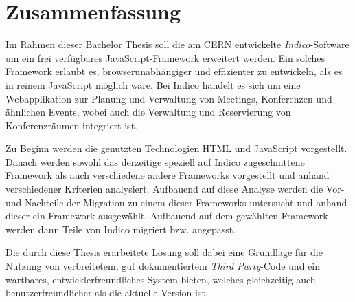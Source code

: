 \chapter*{Zusammenfassung}
\thispagestyle{empty}

Im Rahmen dieser Bachelor Thesis soll die am CERN entwickelte \emph{Indico}-Software um ein
frei verfügbares JavaScript-Framework erweitert werden. Ein solches Framework erlaubt es,
browserunabhängiger und effizienter zu entwickeln, als es in reinem JavaScript möglich wäre. Bei
Indico handelt es sich um eine Webapplikation zur Planung und Verwaltung von Meetings, Konferenzen
und ähnlichen Events, wobei auch die Verwaltung und Reservierung von Konferenzräumen integriert ist.

Zu Beginn werden die genutzten Technologien HTML und JavaScript vorgestellt. Danach werden sowohl
das derzeitige speziell auf Indico zugeschnittene Framework als auch verschiedene andere Frameworks
vorgestellt und anhand verschiedener Kriterien analysiert. Aufbauend auf diese Analyse werden die
Vor- und Nachteile der Migration zu einem dieser Frameworks untersucht und anhand dieser ein
Framework ausgewählt. Aufbauend auf dem gewählten Framework werden dann Teile von Indico migriert
bzw. angepasst.

Die durch diese Thesis erarbeitete Lösung soll dabei eine Grundlage für die Nutzung von
verbreitetem, gut dokumentiertem \emph{Third Party}-Code und ein wartbares, entwicklerfreundliches
System bieten, welches gleichzeitig auch benutzerfreundlicher als die aktuelle Version ist.
